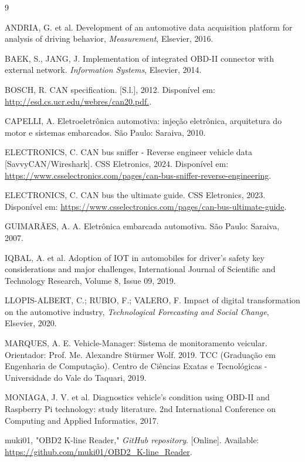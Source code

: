 \documentclass[a4paper, 12pt]{article}
\begin{document}
\begin{thebibliography}{9}

ANDRIA, G. et al. Development of an automotive data acquisition platform for analysis of driving behavior, \textit{Measurement}, Elsevier, 2016.

BAEK, S., JANG, J. Implementation of integrated OBD-II connector with external network. \textit{Information Systems}, Elsevier, 2014.

BOSCH, R. CAN specification. [S.l.], 2012. Disponível em: \url{http://esd.cs.ucr.edu/webres/can20.pdf.}.

CAPELLI, A. Eletroeletrônica automotiva: injeção eletrônica, arquitetura do motor e sistemas embarcados. São Paulo: Saraiva, 2010.

ELECTRONICS, C. CAN bus sniffer - Reverse engineer vehicle data [SavvyCAN/Wireshark]. CSS Eletronics, 2024. Disponível em: \url{https://www.csselectronics.com/pages/can-bus-sniffer-reverse-engineering}.

ELECTRONICS, C. CAN bus the ultimate guide. CSS Eletronics, 2023. Disponível em: \url{https://www.csselectronics.com/pages/can-bus-ultimate-guide}.

GUIMARÃES, A. A. Eletrônica embarcada automotiva. São Paulo: Saraiva, 2007.

IQBAL, A. et al. Adoption of IOT in automobiles for driver’s safety key considerations and major challenges, International Journal of Scientific and Technology Research, Volume 8, Issue 09, 2019.

LLOPIS-ALBERT, C.; RUBIO, F.; VALERO, F. Impact of digital transformation on the automotive industry, \textit{Technological Forecasting and Social Change}, Elsevier, 2020.

MARQUES, A. E. Vehicle-Manager: Sistema de monitoramento veicular. Orientador: Prof. Me. Alexandre Stürmer Wolf. 2019. TCC (Graduação em Engenharia de Computação). Centro de Ciências Exatas e Tecnológicas - Universidade do Vale do Taquari, 2019.

MONIAGA, J. V. et al. Diagnostics vehicle’s condition using OBD-II and Raspberry Pi technology: study literature. 2nd International Conference on Computing and Applied Informatics, 2017.

muki01, "OBD2 K-line Reader," \textit{GitHub repository}. [Online]. Available: \url{https://github.com/muki01/OBD2_K-line_Reader}.


\end{thebibliography}
\end{document}
